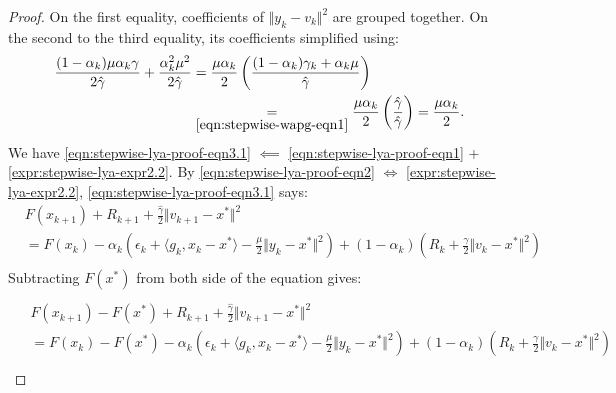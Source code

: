\documentclass[12pt]{article}
\begin{document}
\begin{proof}
        On the first equality, coefficients of $\Vert y_k - v_k\Vert^2$ are grouped together. 
        On the second to the third equality, its coefficients simplified using: 
        \begin{align*}
            \frac{(1 - \alpha_k)\mu\alpha_k\gamma}{2\hat \gamma} + 
            \frac{\alpha_k^2 \mu^2}{2\hat \gamma}
            &= 
            \frac{\mu\alpha_k}{2}\left(
                \frac{(1 - \alpha_k)\gamma_k + \alpha_k \mu}{\hat \gamma}
            \right)
            \\
            &\underset{\eqref{eqn:stepwise-wapg-eqn1}}{=} \frac{\mu\alpha_k}{2}\left(
                \frac{\hat \gamma}{\hat \gamma}
            \right) = \frac{\mu\alpha_k}{2}. 
        \end{align*}
        We have \eqref{eqn:stepwise-lya-proof-eqn3.1} $\impliedby$ \eqref{eqn:stepwise-lya-proof-eqn1} + \eqref{expr:stepwise-lya-expr2.2}. 
        By \eqref{eqn:stepwise-lya-proof-eqn2} $\iff$ \eqref{expr:stepwise-lya-expr2.2},
        \eqref{eqn:stepwise-lya-proof-eqn3.1} says: 
        \begin{align*}
            & F(x_{k + 1}) + R_{k + 1} + 
            \frac{\hat \gamma}{2}\Vert v_{k + 1} - x^*\Vert^2
            \\
            &= 
            F(x_k) - \alpha_k\left(
                \epsilon_k + \langle g_k, x_k - x^*\rangle
                - \frac{\mu}{2}\Vert y_k - x^*\Vert^2
            \right)
            + 
            (1 - \alpha_k)\left(
                R_k + \frac{\gamma}{2}\Vert v_k - x^*\Vert^2
            \right)
            \\
        \end{align*}
        Subtracting $F(x^*)$ from both side of the equation gives: 
        \begin{align}\label{eqn:stepwise-lya-proof-eqn3.2}
            \begin{split}
                \\
                & F(x_{k + 1}) - F(x^*) + R_{k + 1} + 
                \frac{\hat \gamma}{2}\Vert v_{k + 1} - x^*\Vert^2
                \\
                &= 
                F(x_k) - F(x^*) - \alpha_k\left(
                    \epsilon_k + \langle g_k, x_k - x^*\rangle
                    - \frac{\mu}{2}\Vert y_k - x^*\Vert^2
                \right)
                + 
                (1 - \alpha_k)\left(
                    R_k + \frac{\gamma}{2}\Vert v_k - x^*\Vert^2
                \right)
                \\

\end{split}
\end{align}
\end{proof}
\end{document}
